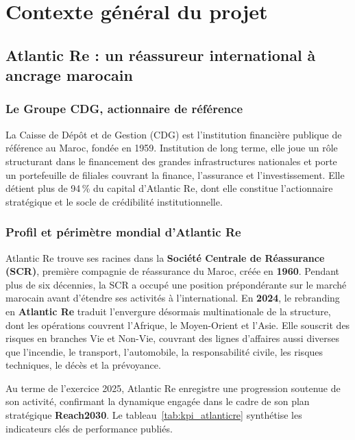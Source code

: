 \documentclass[12pt,a4paper]{report}
\begin{document}
\chapter{Contexte général du projet}
\label{chap:contexte}

\section{Atlantic Re : un réassureur international à ancrage marocain}

\subsection{Le Groupe CDG, actionnaire de référence}

La Caisse de Dépôt et de Gestion (CDG) est l'institution financière publique de
référence au Maroc, fondée en 1959. Institution de long terme, elle joue un rôle
structurant dans le financement des grandes infrastructures nationales et porte un
portefeuille de filiales couvrant la finance, l'assurance et l'investissement. Elle
détient plus de 94\,\% du capital d'Atlantic Re, dont elle constitue l'actionnaire
stratégique et le socle de crédibilité institutionnelle.

\subsection{Profil et périmètre mondial d'Atlantic Re}

Atlantic Re trouve ses racines dans la \textbf{Société Centrale de Réassurance
(SCR)}, première compagnie de réassurance du Maroc, créée en \textbf{1960}. Pendant
plus de six décennies, la SCR a occupé une position prépondérante sur le marché
marocain avant d'étendre ses activités à l'international. En \textbf{2024}, le
rebranding en \textbf{Atlantic Re} traduit l'envergure désormais multinationale de
la structure, dont les opérations couvrent l'Afrique, le Moyen-Orient et l'Asie.
Elle souscrit des risques en branches Vie et Non-Vie, couvrant des lignes d'affaires
aussi diverses que l'incendie, le transport, l'automobile, la responsabilité civile,
les risques techniques, le décès et la prévoyance.

Au terme de l'exercice 2025, Atlantic Re enregistre une progression soutenue de son
activité, confirmant la dynamique engagée dans le cadre de son plan stratégique
\textbf{Reach2030}. Le tableau~\ref{tab:kpi_atlanticre} synthétise les indicateurs
clés de performance publiés.
\end{document}
